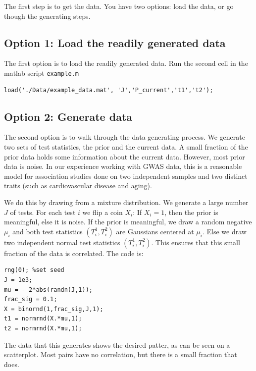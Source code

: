 \documentclass[english,11pt]{article} %
\begin{document}
The first step is to get the data. You have two options: load the data, or go though the generating steps.

\subsection{Option 1: Load the readily generated data}

The first option is to load the readily generated data. Run the second cell in the matlab script \verb+example.m+

\begin{verbatim}
load('./Data/example_data.mat', 'J','P_current','t1','t2');
\end{verbatim}


\subsection{Option 2: Generate data}

The second option is to walk through the data generating process. We generate two sets of test statistics, the prior and the current data. A small fraction of the prior data holds some information about the current data. However, most prior data is noise. In our experience working with GWAS data, this is a reasonable model for association studies done on two independent samples and two distinct traits (such as cardiovascular disease and aging).

We do this by drawing from a mixture distribution. We generate a large number $J$ of tests. For each test $i$ we flip a coin $X_i$: If $X_i=1$, then the prior is meaningful, else it is noise. If the prior is meaningful, we draw a random negative $\mu_i$ and both test statistics $(T^{1}_i,T^{2}_i)$ are Gaussians centered at $\mu_i$. Else we draw two independent normal test statistics $(T^{1}_i,T^{2}_i)$. This ensures that this small fraction of the data is correlated. The code is:


\begin{verbatim}
rng(0); %set seed
J = 1e3;
mu = - 2*abs(randn(J,1));
frac_sig = 0.1;
X = binornd(1,frac_sig,J,1);
t1 = normrnd(X.*mu,1);
t2 = normrnd(X.*mu,1);
\end{verbatim}

The data that this generates shows the desired patter, as can be seen on a scatterplot. Most pairs have no correlation, but there is a small fraction that does.
\end{document}
